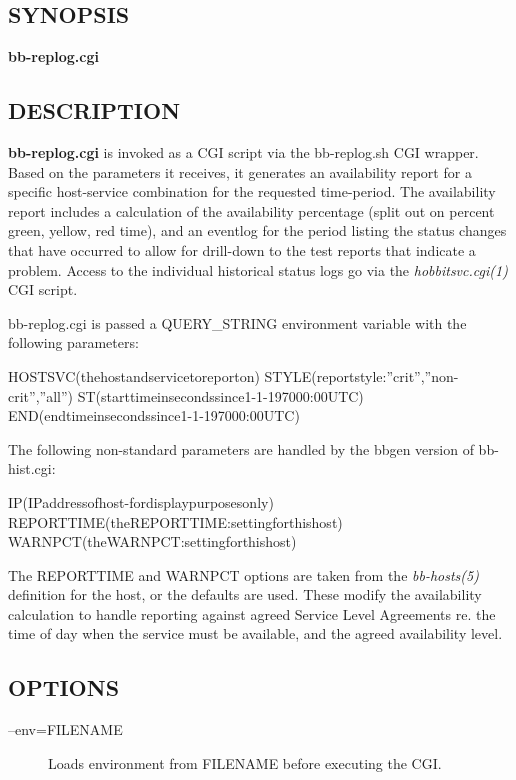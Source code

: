 \subsection{SYNOPSIS}
\textbf{bb-replog.cgi}


 
\subsection{DESCRIPTION}
\textbf{bb-replog.cgi}
 is invoked as a CGI script via the bb-replog.sh CGI wrapper. Based on
 the parameters it receives, it generates an availability report for a
 specific host-service combination for the requested time-period. The
 availability report includes a calculation of the availability
 percentage (split out on percent green, yellow, red time), and an
 eventlog for the period listing the status changes that have occurred
 to allow for drill-down to the test reports that indicate a
 problem. Access to the individual historical status logs go via the
 \emph{hobbitsvc.cgi(1)} CGI script. 


  bb-replog.cgi is passed a QUERY\_STRING environment variable with the following parameters: 


  
HOSTSVC(thehostandservicetoreporton)  
STYLE(reportstyle:''crit'',''non-crit'',''all'')  
ST(starttimeinsecondssince1-1-197000:00UTC)  
END(endtimeinsecondssince1-1-197000:00UTC) 


  The following non-standard parameters are handled by the bbgen version of bb-hist.cgi: 


  
IP(IPaddressofhost-fordisplaypurposesonly)  
REPORTTIME(theREPORTTIME:settingforthishost)  
WARNPCT(theWARNPCT:settingforthishost) 


  The REPORTTIME and WARNPCT options are taken from the
  \emph{bb-hosts(5)} definition for the host, or the defaults are
  used. These modify the availability calculation to handle reporting
  against agreed Service Level Agreements re. the time of day when the
  service must be available, and the agreed availability level. 



 
\subsection{OPTIONS}
\begin{description}
\item[--env=FILENAME] Loads environment from FILENAME before executing the CGI. 

 


\end{description}
